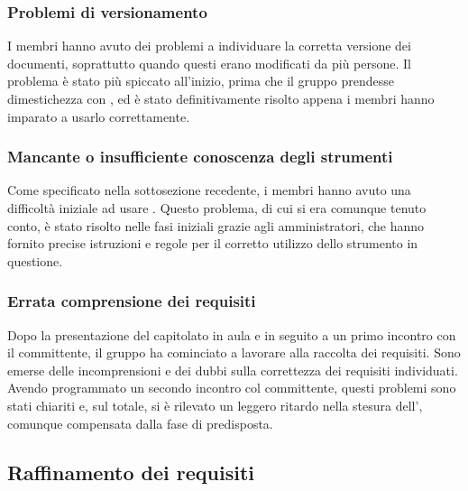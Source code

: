 \documentclass[a4paper, titlepage]{article}
\begin{document}
	\subsubsection{Problemi di versionamento}
	I membri hanno avuto dei problemi a individuare la corretta versione dei documenti, soprattutto quando questi erano modificati da più persone. Il problema è stato più spiccato all'inizio, prima che il gruppo prendesse dimestichezza con , ed è stato definitivamente risolto appena i membri hanno imparato a usarlo correttamente.
	
	\subsubsection{Mancante o insufficiente conoscenza degli strumenti}
	Come specificato nella sottosezione recedente, i membri hanno avuto una difficoltà iniziale ad usare . Questo problema, di cui si era comunque tenuto conto, è stato risolto nelle fasi iniziali grazie agli amministratori, che hanno fornito precise istruzioni e regole per il corretto utilizzo dello strumento in questione.
	
	\subsubsection{Errata comprensione dei requisiti}
	Dopo la presentazione del capitolato in aula e in seguito a un primo incontro con il committente, il gruppo ha cominciato a lavorare alla raccolta dei requisiti. Sono emerse delle incomprensioni e dei dubbi sulla correttezza dei requisiti individuati. Avendo programmato un secondo incontro col committente, questi problemi sono stati chiariti e, sul totale, si è rilevato un leggero ritardo nella stesura dell', comunque compensata dalla fase di  predisposta.
	
	\subsection{Raffinamento dei requisiti}
	
\end{document}
